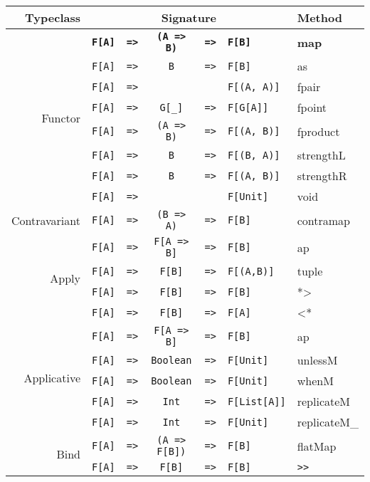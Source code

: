\documentclass{tufte-handout}
\newcommand{\fa}{\texttt{F[A]}}
\newcommand{\fb}{\texttt{F[B]}}
\newcommand{\rarr}{\texttt{=>}}
\begin{document}
\begin{table}[ht]
  \centering
  \selectfont
  \begin{tabular}{rrcclll}
    Typeclass & \multicolumn{5}{c}{Signature} & Method \\
    \midrule
    \multirow{8}{*}{Functor}
      & \textbf{\fa} & \textbf{\rarr} & \textbf{\texttt{(A => B)}} & \textbf{\rarr} & \textbf{\fb} & \textbf{map} \\
      & \fa & \rarr & \texttt{B} & \rarr & \fb & as \\
      & \fa & \rarr & & & \texttt{F[(A, A)]} & fpair \\
      & \fa & \rarr & \texttt{G[\_]} & \rarr & \texttt{F[G[A]]} & fpoint \\
      & \fa & \rarr & \texttt{(A => B)} & \rarr & \texttt{F[(A, B)]} & fproduct \\
      & \fa & \rarr & \texttt{B} & \rarr & \texttt{F[(B, A)]} & strengthL \\
      & \fa & \rarr & \texttt{B} & \rarr & \texttt{F[(A, B)]} & strengthR \\
      & \fa & \rarr & & & \texttt{F[Unit]} & void \\[.5cm]
    Contravariant & \fa & \rarr & \texttt{(B => A)} & \rarr & \fb & contramap \\[.5cm]
    \multirow{4}{*}{Apply} & \fa & \rarr & \texttt{F[A => B]} & \rarr & \fb & ap \\
                  & \fa & \rarr & \fb & \rarr & \texttt{F[(A,B)]} & tuple \\
                  & \fa & \rarr & \fb & \rarr & \fb & *> \\
                  & \fa & \rarr & \fb & \rarr & \fa & <* \\[.5cm]
    \multirow{5}{*}{Applicative} & \fa & \rarr & \texttt{F[A => B]} & \rarr & \fb & ap \\
                  & \fa & \rarr & \texttt{Boolean} & \rarr & \texttt{F[Unit]} & unlessM \\
                  & \fa & \rarr & \texttt{Boolean} & \rarr & \texttt{F[Unit]} & whenM \\
                  & \fa & \rarr & \texttt{Int} & \rarr & \texttt{F[List[A]]} & replicateM \\
                  & \fa & \rarr & \texttt{Int} & \rarr & \texttt{F[Unit]} & replicateM\_ \\[.5cm]
    \multirow{2}{*}{Bind} & \fa & \rarr & \texttt{(A => F[B])} & \rarr & \fb & flatMap \\
                  & \fa & \rarr & \fb & \rarr & \fb & \verb$>>$ \\[.5cm]

\end{tabular}
\end{table}
\end{document}
